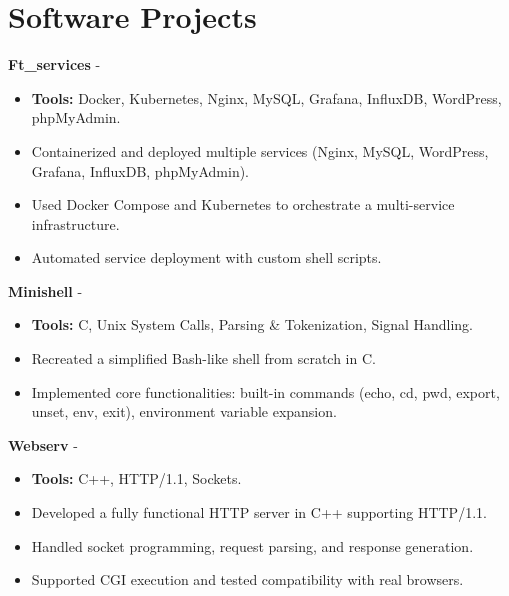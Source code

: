 \documentclass[a4paper,11pt]{article}%
\begin{document}
\section*{Software Projects}%
%
\noindent \textbf{Ft\_services} - \href{https://github.com/sboof911/ft_services}{{}}%
\begin{itemize}[leftmargin=2em,parsep=0pt,topsep=1em]%
\item[] \textbf{Tools:} Docker, Kubernetes, Nginx, MySQL, Grafana, InfluxDB, WordPress, phpMyAdmin.%
\item Containerized and deployed multiple services (Nginx, MySQL, WordPress, Grafana, InfluxDB, phpMyAdmin).%
\item Used Docker Compose and Kubernetes to orchestrate a multi-service infrastructure.%
\item Automated service deployment with custom shell scripts.%
\end{itemize}%
%
\noindent \textbf{Minishell} - \href{https://github.com/sboof911/minishell}{{}}%
\begin{itemize}[leftmargin=2em,parsep=0pt,topsep=1em]%
\item[] \textbf{Tools:} C, Unix System Calls, Parsing \& Tokenization, Signal Handling.%
\item Recreated a simplified Bash-like shell from scratch in C.%
\item Implemented core functionalities: built-in commands (echo, cd, pwd, export, unset, env, exit), environment variable expansion.%
\end{itemize}%
%
\noindent \textbf{Webserv} - \href{https://github.com/sboof911/webserv}{{}}%
\begin{itemize}[leftmargin=2em,parsep=0pt,topsep=1em]%
\item[] \textbf{Tools:} C++, HTTP/1.1, Sockets.%
\item Developed a fully functional HTTP server in C++ supporting HTTP/1.1.%
\item Handled socket programming, request parsing, and response generation.%
\item Supported CGI execution and tested compatibility with real browsers.%
\end{itemize}%
\end{document}
